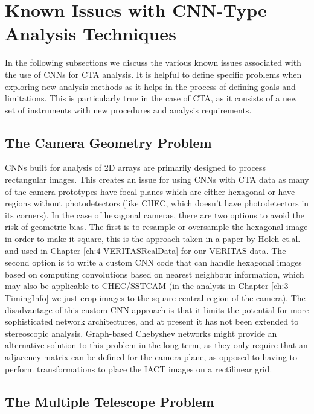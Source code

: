 \section{Known Issues with CNN-Type Analysis Techniques}
In the following subsections we discuss the various known issues associated with the use of CNNs for CTA analysis. It is helpful to define specific problems when exploring new analysis methods as it helps in the process of defining goals and limitations. This is particularly true in the case of CTA, as it consists of a new set of instruments with new procedures and analysis requirements.

\subsection{The Camera Geometry Problem}

CNNs built for analysis of 2D arrays are primarily designed to process rectangular images. This creates an issue for using CNNs with CTA data as many of the camera prototypes have focal planes which are either hexagonal or have regions without photodetectors (like CHEC, which doesn't have photodetectors in its corners). In the case of hexagonal cameras, there are two options to avoid the risk of geometric bias. The first is to resample or oversample the hexagonal image in order to make it square, this is the approach taken in a paper by Holch et.al. \cite{Hexagdly} and used in Chapter \ref{ch:4-VERITASRealData} for our VERITAS data. The second option is to write a custom CNN code that can handle hexagonal images based on computing convolutions based on nearest neighbour information, which may also be applicable to CHEC/SSTCAM (in the analysis in Chapter \ref{ch:3-TimingInfo} we just crop images to the square central region of the camera). The disadvantage of this custom CNN approach is that it limits the potential for more sophisticated network architectures, and at present it has not been extended to stereoscopic analysis. Graph-based Chebyshev networks \cite{adithesis} might provide an alternative solution to this problem in the long term, as they only require that an adjacency matrix can be defined for the camera plane, as opposed to having to perform transformations to place the IACT images on a rectilinear grid. 

\subsection{The Multiple Telescope Problem}

